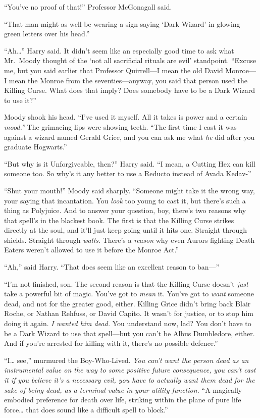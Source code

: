 ``You've no proof of that!'' Professor McGonagall said.

``That man might as well be wearing a sign saying `Dark Wizard' in
glowing green letters over his head.''

``Ah\ldots{}'' Harry said. It didn't seem like an especially good time
to ask what Mr.~Moody thought of the `not all sacrificial rituals are
evil' standpoint. ``Excuse me, but you said earlier that Professor
Quirrell---I mean the old David Monroe---I mean the Monroe from the
seventies---anyway, you said that person used the Killing Curse. What
does that imply? Does somebody have to be a Dark Wizard to use it?''

Moody shook his head. ``I've used it myself. All it takes is power and a
certain \emph{mood.''} The grimacing lips were showing teeth. ``The
first time I cast it was against a wizard named Gerald Grice, and you
can ask me what \emph{he} did after you graduate Hogwarts.''

``But why is it Unforgiveable, then?'' Harry said. ``I mean, a Cutting
Hex can kill someone too. So why's it any better to use a Reducto
instead of Avada Kedav-''

``Shut your mouth!'' Moody said sharply. ``Someone might take it the
wrong way, your saying that incantation. You \emph{look} too young to
cast it, but there's such a thing as Polyjuice. And to answer your
question, boy, there's two reasons why that spell's in the blackest
book. The first is that the Killing Curse strikes directly at the soul,
and it'll just keep going until it hits one. Straight through shields.
Straight through \emph{walls.} There's a \emph{reason} why even Aurors
fighting Death Eaters weren't allowed to use it before the Monroe Act.''

``Ah,'' said Harry. ``That does seem like an excellent reason to
ban---''

``I'm not finished, son. The second reason is that the Killing Curse
doesn't \emph{just} take a powerful bit of magic. You've got to
\emph{mean} it. You've got to \emph{want} someone dead, and not for the
greater good, either. Killing Grice didn't bring back Blair Roche, or
Nathan Rehfuss, or David Capito. It wasn't for justice, or to stop him
doing it again. \emph{I wanted him dead.} You understand now, lad? You
don't have to be a Dark Wizard to use that spell---but you can't be
Albus Dumbledore, either. And if you're arrested for killing with it,
there's no possible defence.''

``I\ldots{} see,'' murmured the Boy-Who-Lived. \emph{You can't want the
person dead as an instrumental value on the way to some positive future
consequence, you can't cast it if you believe it's a necessary evil, you
have to actually want them dead for the sake of being dead, as a
terminal value in your utility function.} ``A magically embodied
preference for death over life, striking within the plane of pure life
force\ldots{} that does sound like a difficult spell to block.''

